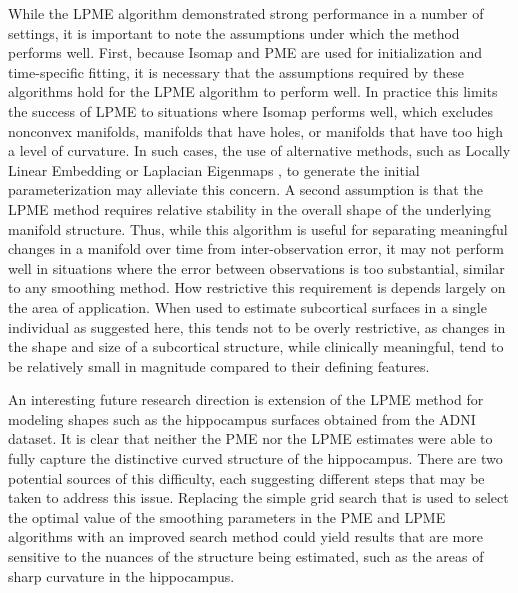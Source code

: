 \documentclass[12pt]{article}
\theoremstyle{definition}
\begin{document}
While the LPME algorithm demonstrated strong performance in a number of settings, it is important to note the assumptions under which the method performs well. First, because Isomap and PME are used for initialization and time-specific fitting, it is necessary that the assumptions required by these algorithms hold for the LPME algorithm to perform well. In practice this limits the success of LPME to situations where Isomap performs well, which excludes nonconvex manifolds, manifolds that have holes, or manifolds that have too high a level of curvature. In such cases, the use of alternative methods, such as Locally Linear Embedding \citep{roweisNonlinearDimensionalityReduction2000} or Laplacian Eigenmaps \citep{belkin2003laplacian}, to generate the initial parameterization may alleviate this concern. A second assumption is that the LPME method requires relative stability in the overall shape of the underlying manifold structure. Thus, while this algorithm is useful for separating meaningful changes in a manifold over time from inter-observation error, it may not perform well in situations where the error between observations is too substantial, similar to any smoothing method. How restrictive this requirement is depends largely on the area of application. When used to estimate subcortical surfaces in a single individual as suggested here, this tends not to be overly restrictive, as changes in the shape and size of a subcortical structure, while clinically meaningful, tend to be relatively small in magnitude compared to their defining features.

An interesting future research direction is extension of the LPME method for modeling  shapes such as the hippocampus surfaces obtained from the ADNI dataset. It is clear that neither the PME nor the LPME estimates were able to fully capture the distinctive curved structure of the hippocampus. There are two potential sources of this difficulty, each suggesting different steps that may be taken to address this issue. Replacing the simple grid search that is used to select the optimal value of the smoothing parameters in the PME and LPME algorithms with an improved search method could yield results that are more sensitive to the nuances of the structure being estimated, such as the areas of sharp curvature in the hippocampus.
\end{document}

